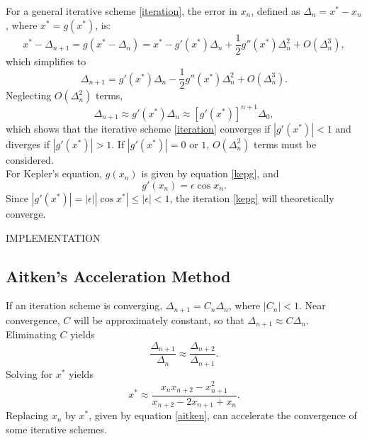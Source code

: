 \documentclass[10pt]{article}
\begin{document}
\noindent For a general iterative scheme \ref{iteration}, the error in $x_n$, defined as $\Delta_n = x^*-x_n$, where $x^*=g\left(x^*\right)$, is:
\begin{equation*}
x^* - \Delta_{n+1} = g\left(x^*-\Delta_n\right) = x^* -  g'\left(x^*\right) \Delta_n + \frac{1}{2} g''\left(x^*\right) \Delta_n^2 + O\left(\Delta_n^3\right),
\end{equation*}
\noindent which simplifies to
\begin{equation}\label{converge}
\Delta_{n+1} =  g'\left(x^*\right) \Delta_n - \frac{1}{2} g''\left(x^*\right) \Delta_n^2 + O\left(\Delta_n^3\right).
\end{equation}
\noindent Neglecting $O\left(\Delta_n^2\right)$ terms,
\begin{equation*}
\Delta_{n+1} \approx g'\left(x^*\right) \Delta_n \approx \left[g'\left(x^*\right)\right]^{n+1} \Delta_0,
\end{equation*}
\noindent which shows that the iterative scheme \ref{iteration} converges if $\left|g'\left(x^*\right)\right| < 1$ and diverges if $\left|g'\left(x^*\right)\right| > 1$. If $\left|g'\left(x^*\right)\right| =0$ or $1$, $O\left(\Delta_n^2\right)$ terms must be considered. \\

\noindent For Kepler's equation, $g\left(x_n\right)$ is given by equation \ref{kepg}, and
\begin{equation*}
g'\left(x_n\right) = \epsilon \cos x_n.
\end{equation*}
\noindent Since $\left|g'\left(x^*\right)\right| = \left|\epsilon\right| \left|\cos x^*\right| \le \left|\epsilon\right| < 1$, the iteration \ref{kepg} will theoretically converge.

\noindent IMPLEMENTATION


\subsection{Aitken's Acceleration Method}

\noindent If an iteration scheme is converging, $\Delta_{n+1} = C_n \Delta_n$, where $\left|C_n\right| < 1$. Near convergence, $C$ will be approximately constant, so that $\Delta_{n+1} \approx C \Delta_n$. Eliminating $C$ yields
\begin{equation*}
\frac{\Delta_{n+1}}{\Delta_n} \approx \frac{\Delta_{n+2}}{\Delta_{n+1}}.
\end{equation*}
\noindent Solving for $x^*$ yields
\begin{equation}\label{aitken}
x^* \approx \frac{x_n x_{n+2} - x^2_{n+1}}{x_{n+2}-2x_{n+1}+x_n}.
\end{equation}
\noindent Replacing $x_n$ by $x^*$, given by equation \ref{aitken}, can accelerate the convergence of some iterative schemes.
\end{document}
